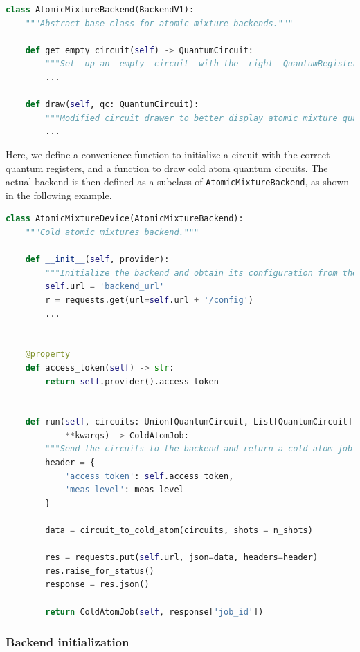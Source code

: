 \documentclass[a4paper, 10pt]{article}
\newcommand{\co}[1]{\texttt{#1}}
\begin{document}
\begin{lstlisting}[language=Python, caption = Parent class for atomic mixture backends, label = {lst:mixtures_backend_class}]
class AtomicMixtureBackend(BackendV1):
    """Abstract base class for atomic mixture backends."""

    def get_empty_circuit(self) -> QuantumCircuit:
        """Set -up an  empty  circuit  with the  right  QuantumRegisters. """
        ...

    def draw(self, qc: QuantumCircuit):
        """Modified circuit drawer to better display atomic mixture quantum  circuits."""
        ...
\end{lstlisting}
Here, we define a convenience function to initialize a circuit with the correct quantum registers, and a function to draw cold atom quantum circuits.
 The actual backend is then defined as a subclass of \co{AtomicMixtureBackend}, as shown in the following example.
\begin{lstlisting}[language=Python, caption = Example backend class, label = {lst:backend_class}]
class AtomicMixtureDevice(AtomicMixtureBackend):
    """Cold atomic mixtures backend."""

    def __init__(self, provider):
        """Initialize the backend and obtain its configuration from the URL."""
        self.url = 'backend_url'
        r = requests.get(url=self.url + '/config')
        ...

            
    @property
    def access_token(self) -> str:
        return self.provider().access_token
            
            
    def run(self, circuits: Union[QuantumCircuit, List[QuantumCircuit]],
            **kwargs) -> ColdAtomJob:
        """Send the circuits to the backend and return a cold atom job."""
        header = {
            'access_token': self.access_token,
            'meas_level': meas_level
        }

        data = circuit_to_cold_atom(circuits, shots = n_shots)

        res = requests.put(self.url, json=data, headers=header)
        res.raise_for_status()
        response = res.json()

        return ColdAtomJob(self, response['job_id'])
\end{lstlisting}

\subsubsection{Backend initialization}
\label{sec:backend_initialization}
\end{document}
